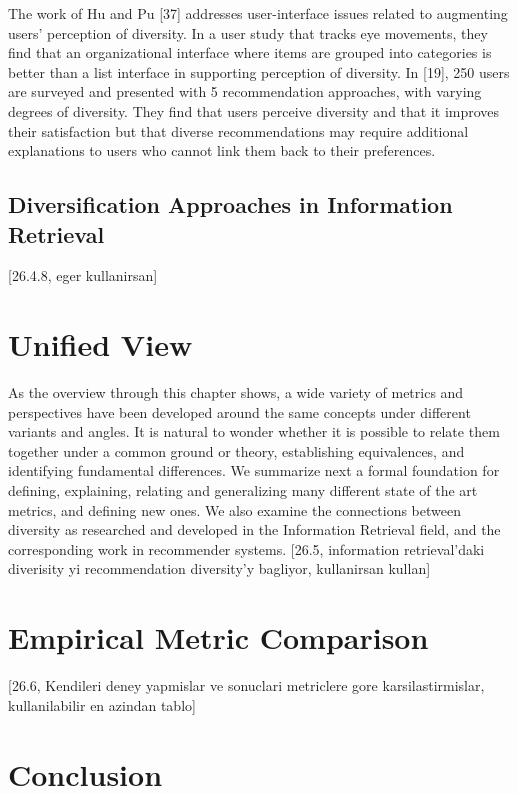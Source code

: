 The work of Hu and Pu [37] addresses user-interface issues related to augmenting users’ perception of diversity. In a user study that tracks eye movements, they find that an organizational interface where items are grouped into categories is better than a list interface in supporting perception of diversity. In [19], 250 users are surveyed and presented with 5 recommendation approaches, with varying degrees of diversity. They find that users perceive diversity and that it improves their satisfaction but that diverse recommendations may require additional explanations to users who cannot link them back to their preferences.

\subsection{Diversification Approaches in Information Retrieval}

[26.4.8, eger kullanirsan]

\section{Unified View}

As the overview through this chapter shows, a wide variety of metrics and perspectives have been developed around the same concepts under different variants and angles. It is natural to wonder whether it is possible to relate them together under a common ground or theory, establishing equivalences, and identifying fundamental differences. We summarize next a formal foundation for defining, explaining, relating and generalizing many different state of the art metrics, and defining new ones. We also examine the connections between diversity as researched and developed in the Information Retrieval field, and the corresponding work in recommender systems.
[26.5, information retrieval'daki diverisity yi recommendation diversity'y bagliyor, kullanirsan kullan]

\section{Empirical Metric Comparison}
[26.6, Kendileri deney yapmislar ve sonuclari metriclere gore karsilastirmislar, kullanilabilir en azindan tablo]

\section{Conclusion}


